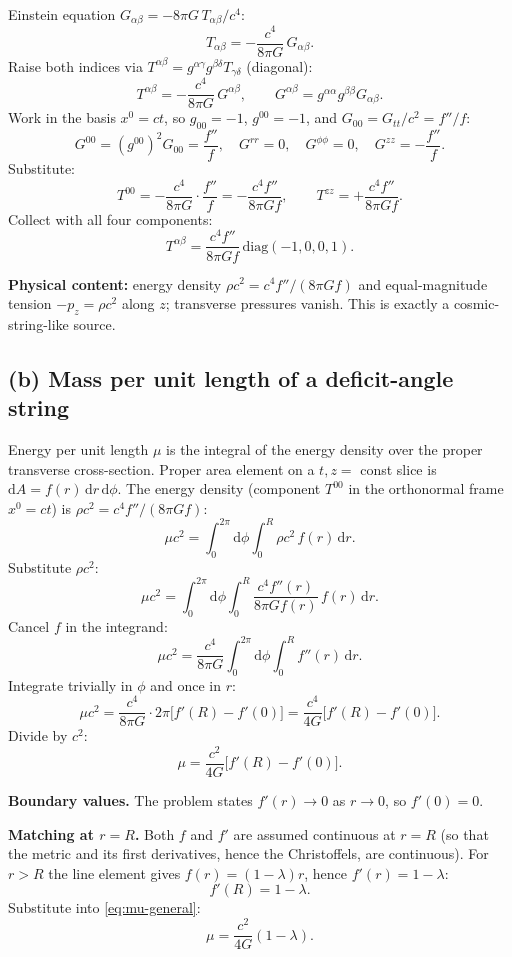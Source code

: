 \documentclass[11pt]{article}
\newcommand{\de}{\mathrm{d}}
\begin{document}
Einstein equation $G_{\alpha\beta} = -8\pi G\,T_{\alpha\beta}/c^4$:
\[
T_{\alpha\beta} = -\frac{c^4}{8\pi G}\,G_{\alpha\beta}.
\]
Raise both indices via $T^{\alpha\beta} = g^{\alpha\gamma}g^{\beta\delta}T_{\gamma\delta}$ (diagonal):
\[
T^{\alpha\beta} = -\frac{c^4}{8\pi G}\,G^{\alpha\beta},\qquad G^{\alpha\beta} = g^{\alpha\alpha}g^{\beta\beta}G_{\alpha\beta}.
\]
Work in the basis $x^0 = ct$, so $g_{00}=-1$, $g^{00}=-1$, and $G_{00}=G_{tt}/c^2 = f''/f$:
\[
G^{00} = (g^{00})^2 G_{00} = \frac{f''}{f},\quad G^{rr}=0,\quad G^{\phi\phi}=0,\quad G^{zz} = -\frac{f''}{f}.
\]
Substitute:
\[
T^{00} = -\frac{c^4}{8\pi G}\cdot\frac{f''}{f} = -\frac{c^4 f''}{8\pi G f},\qquad T^{zz} = +\frac{c^4 f''}{8\pi G f}.
\]
Collect with all four components:
\[
\boxed{\;T^{\alpha\beta} = \frac{c^4 f''}{8\pi G f}\,\text{diag}(-1,0,0,1).\;}
\label{eq:Tab}
\]

\textbf{Physical content:} energy density $\rho c^2 = c^4 f''/(8\pi G f)$ and equal-magnitude tension $-p_z = \rho c^2$ along $z$; transverse pressures vanish. This is exactly a cosmic-string-like source.

\subsection*{(b) Mass per unit length of a deficit-angle string}

Energy per unit length $\mu$ is the integral of the energy density over the proper transverse cross-section. Proper area element on a $t,z=$ const slice is $\de A = f(r)\,\de r\,\de\phi$. The energy density (component $T^{00}$ in the orthonormal frame $x^0=ct$) is $\rho c^2 = c^4 f''/(8\pi G f)$:
\[
\mu c^2 = \int_0^{2\pi}\!\de\phi\int_0^{R}\!\rho c^2\,f(r)\,\de r.
\]
Substitute $\rho c^2$:
\[
\mu c^2 = \int_0^{2\pi}\!\de\phi\int_0^{R}\!\frac{c^4 f''(r)}{8\pi G f(r)}\,f(r)\,\de r.
\]
Cancel $f$ in the integrand:
\[
\mu c^2 = \frac{c^4}{8\pi G}\int_0^{2\pi}\!\de\phi\int_0^{R}\! f''(r)\,\de r.
\]
Integrate trivially in $\phi$ and once in $r$:
\[
\mu c^2 = \frac{c^4}{8\pi G}\cdot 2\pi\bigl[f'(R) - f'(0)\bigr] = \frac{c^4}{4G}\bigl[f'(R) - f'(0)\bigr].
\]
Divide by $c^2$:
\[
\boxed{\;\mu = \frac{c^2}{4G}\bigl[f'(R) - f'(0)\bigr].\;}
\label{eq:mu-general}
\]

\textbf{Boundary values.} The problem states $f'(r)\to 0$ as $r\to 0$, so $f'(0)=0$.

\textbf{Matching at $r=R$.} Both $f$ and $f'$ are assumed continuous at $r=R$ (so that the metric and its first derivatives, hence the Christoffels, are continuous). For $r>R$ the line element gives $f(r) = (1-\lambda)r$, hence $f'(r) = 1-\lambda$:
\[
f'(R) = 1-\lambda.
\]
Substitute into \eqref{eq:mu-general}:
\[
\boxed{\;\mu = \frac{c^2}{4G}(1-\lambda).\;}
\label{eq:mu-cosmic}
\]
\end{document}
